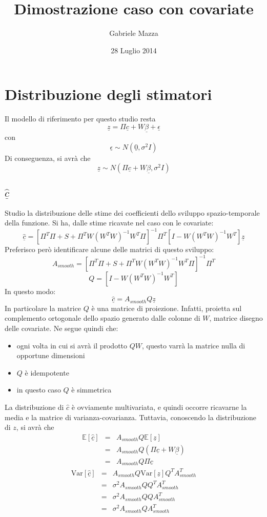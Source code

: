 \documentclass[a4paper,12pt]{report}				%
\date{28 Luglio 2014}
\author{Gabriele Mazza}
\title{Dimostrazione caso con covariate}
\begin{document}

\chapter{Distribuzione degli stimatori}
Il modello di riferimento per questo studio resta
$$
\underline{z}=\Pi\underline{c}+W\underline{\beta}+\underline{\epsilon}
$$
con
$$
\underline{\epsilon}\sim N(\underline{0},\sigma^2I)
$$
Di conseguenza, si avrà che
$$
\underline{z}\sim N(\Pi\underline{c}+W\underline{\beta}, \sigma^2I)
$$

\section{$\underline{\hat{c}}$}
Studio la distribuzione delle stime dei coefficienti dello sviluppo spazio-temporale della funzione.
Si ha, dalle stime ricavate nel caso con le covariate:
$$
\underline{\hat{c}}=[\Pi^T\Pi+S+\Pi^TW(W^TW)^{-1}W^T\Pi]^{-1}\Pi^T[I-W(W^TW)^{-1}W^T]\underline{z}
$$
Preferisco però identificare alcune delle matrici di questo sviluppo:
$$
A_{smooth}=[\Pi^T\Pi+S+\Pi^TW(W^TW)^{-1}W^T\Pi]^{-1}\Pi^T
$$
$$
Q=[I-W(W^TW)^{-1}W^T]
$$
In questo modo:
$$
\underline{\hat{c}}=A_{smooth}Q\underline{z}
$$
In particolare la matrice $Q$ è una matrice di proiezione. Infatti, proietta sul complemento ortogonale dello spazio generato dalle colonne di $W$, matrice disegno delle covariate. Ne segue quindi che:
\begin{itemize}
\item ogni volta in cui si avrà il prodotto $QW$, questo varrà la matrice nulla di opportune dimensioni
\item $Q$ è idempotente
\item in questo caso $Q$ è simmetrica
\end{itemize} 

La distribuzione di $\hat{c}$ è ovviamente multivariata, e quindi occorre ricavarne la media e la matrice di varianza-covarianza. Tuttavia, conoscendo la distribuzione di $z$, si avrà che
\begin{eqnarray*}
\mathbb{E}[\underline{\hat{c}}] &=& A_{smooth}Q\mathbb{E}[\underline{z}] \\
								&=& A_{smooth}Q(\Pi\underline{c}+W\underline{\beta}) \\
								&=& A_{smooth}Q\Pi\underline{c}								
\end{eqnarray*}
\begin{eqnarray*}
\mathrm{Var}[\underline{\hat{c}}] &=& A_{smooth}Q\mathrm{Var}[\underline{z}]Q^T A_{smooth}^T \\
								&=& \sigma^2 A_{smooth}Q Q^T A_{smooth}^T \\
								&=&  \sigma^2 A_{smooth}Q Q A_{smooth}^T \\
								&=&  \sigma^2 A_{smooth}Q A_{smooth}^T \\						
\end{eqnarray*}
\end{document}
